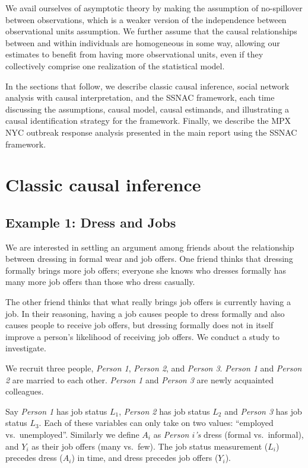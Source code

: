 \documentclass[
  letterpaper,
  DIV=11,
  numbers=noendperiod,
  oneside]{scrreprt}
\begin{document}
We avail ourselves of asymptotic theory by making the assumption of
no-spillover between observations, which is a weaker version of the
independence between observational units assumption. We further assume
that the causal relationships between and within individuals are
homogeneous in some way, allowing our estimates to benefit from having
more observational units, even if they collectively comprise one
realization of the statistical model.

In the sections that follow, we describe classic causal inference,
social network analysis with causal interpretation, and the SSNAC
framework, each time discussing the assumptions, causal model, causal
estimands, and illustrating a causal identification strategy for the
framework. Finally, we describe the MPX NYC outbreak response analysis
presented in the main report using the SSNAC framework.

\hypertarget{sec-classic-causal-inference}{%
\section{Classic causal inference}\label{sec-classic-causal-inference}}

\hypertarget{example-1-dress-and-jobs}{%
\subsection*{Example 1: Dress and Jobs}\label{example-1-dress-and-jobs}}

We are interested in settling an argument among friends about the
relationship between dressing in formal wear and job offers. One friend
thinks that dressing formally brings more job offers; everyone she knows
who dresses formally has many more job offers than those who dress
casually.

The other friend thinks that what really brings job offers is currently
having a job. In their reasoning, having a job causes people to dress
formally and also causes people to receive job offers, but dressing
formally does not in itself improve a person's likelihood of receiving
job offers. We conduct a study to investigate.

We recruit three people, \emph{Person 1}, \emph{Person 2}, and
\emph{Person 3}. \emph{Person 1} and \emph{Person 2} are married to each
other. \emph{Person 1} and \emph{Person 3} are newly acquainted
colleagues.

Say \emph{Person 1} has job status \(L_1\), \emph{Person 2} has job
status \(L_2\) and \emph{Person 3} has job status \(L_3\). Each of these
variables can only take on two values: ``employed vs.~unemployed''.
Similarly we define \(A_i\) as \emph{Person \(i\)'s} dress (formal
vs.~informal), and \(Y_i\) as their job offers (many vs.~few). The job
status measurement (\(L_i\)) precedes dress (\(A_i\)) in time, and dress
precedes job offers (\(Y_i\)).
\end{document}
